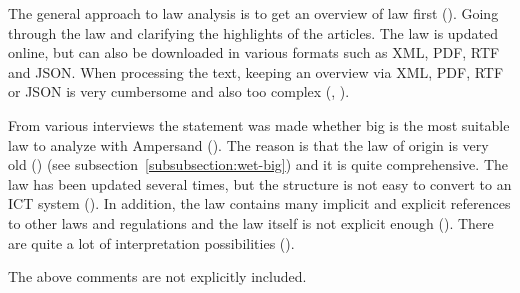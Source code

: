 The general approach to law analysis is to get an overview of law first ().
Going through the law and clarifying the highlights of the articles.
The law is updated online, but can also be downloaded in various formats such as XML, PDF, RTF and JSON.
When processing the text, keeping an overview via XML, PDF, RTF or JSON is very cumbersome and also too complex (, ).
\label{s:6_5_suitability_of_the_law}

From various interviews the statement was made whether \acrshort{big} is the most suitable law to analyze with Ampersand ().
The reason is that the law of origin is very old () (see subsection~\ref{subsubsection:wet-big}) and it is quite comprehensive.
The law has been updated several times, but the structure is not easy to convert to an ICT system ().
In addition, the law contains many implicit and explicit references to other laws and regulations and the law itself is not explicit enough ().
There are quite a lot of interpretation possibilities ().
\label{s:6_6_excluded}

The above comments are not explicitly included.